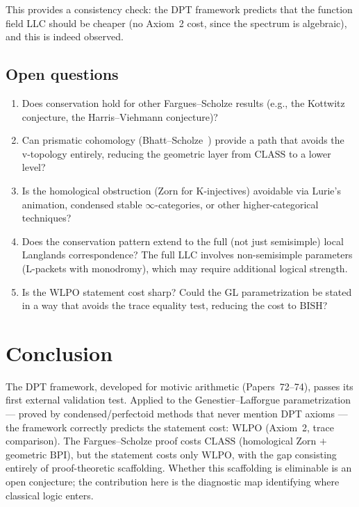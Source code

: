 \documentclass[12pt, a4paper]{article}
\theoremstyle{plain}
\theoremstyle{definition}
\theoremstyle{remark}
\newcommand{\BISH}{\mathrm{BISH}}
\newcommand{\WLPO}{\mathrm{WLPO}}
\newcommand{\CLASS}{\mathrm{CLASS}}
\newcommand{\BPI}{\mathrm{BPI}}
\begin{document}
This provides a consistency check: the DPT framework predicts that
the function field LLC should be cheaper (no Axiom~2 cost, since the
spectrum is algebraic), and this is indeed observed.

\subsection{Open questions}

\begin{enumerate}
  \item Does conservation hold for other Fargues--Scholze results
    (e.g., the Kottwitz conjecture, the Harris--Viehmann conjecture)?
  \item Can prismatic cohomology (Bhatt--Scholze~\cite{scholze-perfectoid})
    provide a path that avoids the v-topology entirely, reducing the
    geometric layer from $\CLASS$ to a lower level?
  \item Is the homological obstruction (Zorn for K-injectives)
    avoidable via Lurie's animation, condensed stable
    $\infty$-categories, or other higher-categorical techniques?
  \item Does the conservation pattern extend to the full (not just
    semisimple) local Langlands correspondence?  The full LLC
    involves non-semisimple parameters (L-packets with monodromy),
    which may require additional logical strength.
  \item Is the $\WLPO$ statement cost sharp?  Could the GL
    parametrization be stated in a way that avoids the trace
    equality test, reducing the cost to $\BISH$?
\end{enumerate}


\section{Conclusion}\label{sec:conclusion}

The DPT framework, developed for motivic arithmetic
(Papers~72--74), passes its first external validation test.
Applied to the Genestier--Lafforgue parametrization --- proved by
condensed/perfectoid methods that never mention DPT axioms --- the
framework correctly predicts the statement cost: $\WLPO$
(Axiom~2, trace comparison).  The Fargues--Scholze proof costs
$\CLASS$ (homological Zorn $+$ geometric $\BPI$), but the
statement costs only $\WLPO$, with the gap consisting entirely of
proof-theoretic scaffolding.  Whether this scaffolding is
eliminable is an open conjecture; the contribution here is the
diagnostic map identifying where classical logic enters.
\end{document}
